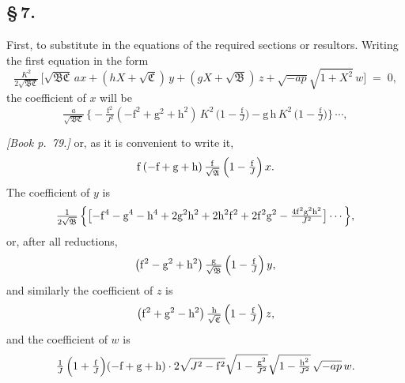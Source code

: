 \documentclass[11pt]{article}
\providecommand{\fA}{\mathfrak{A}}
\providecommand{\fB}{\mathfrak{B}}
\providecommand{\fC}{\mathfrak{C}}
\begin{document}
\bigskip

\subsection*{\S\,7.}

First, to substitute in the equations of the required sections or resultors. Writing the first equation in the form
\[
\tfrac{K^{2}}{2\sqrt{\fB\fC}}\,\bigl[\sqrt{\fB\fC}\,ax + (hX + \sqrt{\fC})\,y + (gX + \sqrt{\fB})\,z + \sqrt{-ap}\sqrt{1 + X^{2}}\,w\bigr] \;=\; 0,
\]
the coefficient of $x$ will be
\[
\tfrac{a}{\sqrt{\fB\fC}}\,\bigl\{-\tfrac{\mathrm{f}^{2}}{J^{2}}(-\mathrm{f}^{2} + \mathrm{g}^{2} + \mathrm{h}^{2})\,K^{2}\,\bigl(1 - \tfrac{\mathrm{f}}{J}\bigr) - \mathrm{g}\,\mathrm{h}\,K^{2}\,\bigl(1 - \tfrac{\mathrm{f}}{J}\bigr)\bigr\}\,\cdots,
\]

\bigskip

\noindent\emph{[Book p.~79.]} or, as it is convenient to write it,
\[
\mathrm{f}\,(-\mathrm{f} + \mathrm{g} + \mathrm{h})\,\tfrac{\mathrm{f}}{\sqrt{\fA}}\,\Bigl(1 - \tfrac{\mathrm{f}}{J}\Bigr)\,x.
\]
The coefficient of $y$ is
\[
\tfrac{1}{2\sqrt{\fB}}\,\Bigl\{\bigl[-\mathrm{f}^{4} - \mathrm{g}^{4} - \mathrm{h}^{4} + 2\mathrm{g}^{2}\mathrm{h}^{2} + 2\mathrm{h}^{2}\mathrm{f}^{2} + 2\mathrm{f}^{2}\mathrm{g}^{2} - \tfrac{4\mathrm{f}^{2}\mathrm{g}^{2}\mathrm{h}^{2}}{J^{2}}\bigr]\cdots\Bigr\},
\]
or, after all reductions,
\[
\bigl(\mathrm{f}^{2} - \mathrm{g}^{2} + \mathrm{h}^{2}\bigr)\,\tfrac{\mathrm{g}}{\sqrt{\fB}}\,\Bigl(1 - \tfrac{\mathrm{f}}{J}\Bigr)\,y,
\]
and similarly the coefficient of $z$ is
\[
\bigl(\mathrm{f}^{2} + \mathrm{g}^{2} - \mathrm{h}^{2}\bigr)\,\tfrac{\mathrm{h}}{\sqrt{\fC}}\,\Bigl(1 - \tfrac{\mathrm{f}}{J}\Bigr)\,z,
\]
and the coefficient of $w$ is
\[
\tfrac{1}{J}\,\Bigl(1 + \tfrac{\mathrm{f}}{J}\Bigr)(-\mathrm{f} + \mathrm{g} + \mathrm{h})\cdot 2\sqrt{J^{2} - \mathrm{f}^{2}}\sqrt{1 - \tfrac{\mathrm{g}^{2}}{J^{2}}}\sqrt{1 - \tfrac{\mathrm{h}^{2}}{J^{2}}}\,\sqrt{-ap}\,w.
\]
\end{document}
